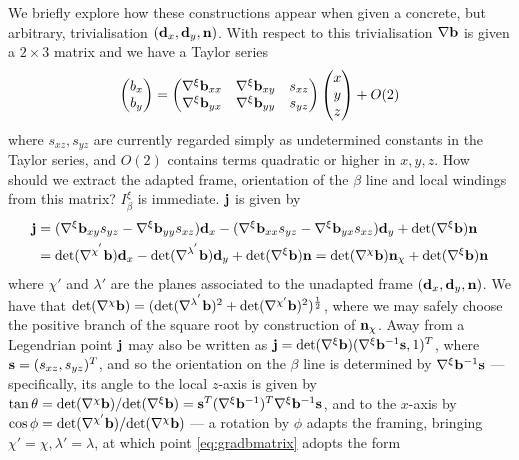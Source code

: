 {We briefly explore how these constructions appear when given a concrete, but arbitrary, trivialisation $(\mathbf{d}_x,\mathbf{d}_y,\mathbf{n})$. With respect to this trivialisation $\nabla \mathbf{b}$ is given a $2\times3$ matrix and we have a Taylor series
\begin{align}
\begin{pmatrix}b_x \\ b_y\end{pmatrix} = 
\begin{pmatrix} 
    \nabla^\xi \mathbf{b}_{xx} & \nabla^\xi \mathbf{b}_{xy} & s_{xz}\\
    \nabla^\xi \mathbf{b}_{yx} & \nabla^\xi \mathbf{b}_{yy} & s_{yz}\\ 
\end{pmatrix}
\begin{pmatrix}x \\ y \\ z \end{pmatrix}  
  + O(2)
\label{eq:gradbmatrix}
\end{align}
where $s_{xz},s_{yz}$ are currently regarded simply as undetermined constants in the Taylor series, and $O(2)$ contains terms quadratic or higher in $x,y,z$. How should we extract the adapted frame, orientation of the $\beta$ line and local windings from this matrix? $I_\beta^\xi$ is immediate. $\mathbf{j}$ is given by
\begin{align}
    \mathbf{j} &= (\nabla^\xi \mathbf{b}_{xy}s_{yz} - \nabla^\xi \mathbf{b}_{yy}s_{xz})\mathbf{d}_x -( \nabla^\xi \mathbf{b}_{xx}s_{yz} - \nabla^\xi \mathbf{b}_{yx}s_{xz})\mathbf{d}_y + \mathrm{det}(\nabla^\xi \mathbf{b}) \mathbf{n} \\
         &= \mathrm{det}(\nabla^{\chi^{'}} \mathbf{b})\mathbf{d}_x  -\mathrm{det}(\nabla^{\lambda^{'}} \mathbf{b})\mathbf{d}_y + \mathrm{det}(\nabla^\xi \mathbf{b}) \mathbf{n} = \mathrm{det}(\nabla^{\chi}\mathbf{b})\mathbf{n}_\chi + \mathrm{det}(\nabla^\xi \mathbf{b}) \mathbf{n}
\end{align}
where $\chi'$ and $\lambda'$ are the planes associated to the unadapted frame $(\mathbf{d}_x,\mathbf{d}_y, \mathbf{n})$. We have that $\mathrm{det}(\nabla^{\chi} \mathbf{b})= (\mathrm{det}(\nabla^{\lambda^{'}} \mathbf{b})^2 + \mathrm{det}(\nabla^{\chi'}\mathbf{b})^2)^\frac{1}{2}$, where we may safely choose the positive branch of the square root by construction of $\mathbf{n}_\chi$. Away from a Legendrian point $\mathbf{j}$ may also be written as $\mathbf{j} = \mathrm{det}(\nabla^\xi \mathbf{b})(\nabla^\xi \mathbf{b}^{-1}\mathbf{s},1)^T$, where $\mathbf{s} = (s_{xz}, s_{yz})^T$, and so the orientation on the $\beta$ line is determined by $\nabla^\xi \mathbf{b}^{-1} \mathbf{s}$ --- specifically, its angle to the local $z$-axis is given by $\tan\theta = \mathrm{det}(\nabla^{\chi}\mathbf{b})/ \mathrm{det}(\nabla^{\xi}\mathbf{b})= \mathbf{s}^T (\nabla^\xi \mathbf{b}^{-1})^T \nabla^\xi \mathbf{b}^{-1} \mathbf{s}$, and to the $x$-axis by $\cos \phi =\mathrm{det}(\nabla^{\chi'}\mathbf{b}) /\mathrm{det}(\nabla^{\chi}\mathbf{b})$ --- a rotation by $\phi$ adapts the framing, bringing $\chi'=\chi, \lambda' = \lambda$, at which point \eqref{eq:gradbmatrix} adopts the form
}
